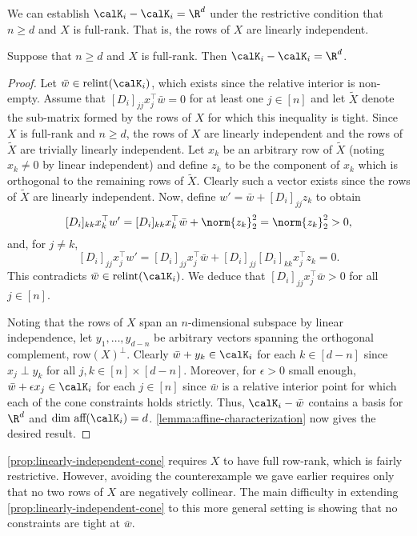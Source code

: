 \documentclass{article}
\begin{document}
We can establish \( \calK_i - \calK_i = \R^d \) under the restrictive condition that \( n \geq d \) and \( X \) is full-rank.
That is, the rows of \( X \) are linearly independent.
\begin{proposition}\label{prop:linearly-independent-cone}
	Suppose that \( n \geq d \) and \( X \) is full-rank.
	Then \( \calK_i - \calK_i = \R^d \).
\end{proposition}
\begin{proof}
	Let \( \bar w \in \text{relint} (\calK_i) \), which exists since the relative interior is non-empty.
	Assume that \( [D_i]_{jj} x_j^\top \bar w = 0 \) for at least one \( j \in [n] \) and let \( \tilde X \) denote the sub-matrix formed by the rows of \( X \) for which this inequality is tight.
	Since \( X \) is full-rank and \( n \geq d \), the rows of \( X \) are linearly independent and the rows of \( \tilde X \) are trivially linearly independent.
	Let \( x_k \) be an arbitrary row of \( \tilde X \) (noting \( x_k \neq 0 \) by linear independent) and define \( z_k \) to be the component of \( x_k \) which is orthogonal to the remaining rows of \( \tilde X \).
	Clearly such a vector exists since the rows of \( \tilde X \) are linearly independent.
	Now, define \( w' = \bar w + [D_i]_{jj} z_k \) to obtain
	\[
		[D_i]_{kk} x_k^\top w' = [D_i]_{kk} x_k^\top \bar w + \norm{z_k}_2^2 = \norm{z_k}_2^2 > 0,
	\]
	and, for \( j \neq k \),
	\[
		[D_i]_{jj} x_j^\top w' = [D_i]_{jj} x_{j}^\top \bar w +  [D_i]_{jj} [D_i]_{kk} x_{j}^\top z_k = 0.
	\]
	This contradicts \( \bar w \in \text{relint} (\calK_i) \).
	We deduce that \( [D_i]_{jj} x_j^\top \bar w > 0 \) for all \( j \in [n] \).

	Noting that the rows of \( X \) span an \( n \)-dimensional subspace by linear independence,
	let \( y_{1}, \ldots, y_{d-n} \) be arbitrary vectors spanning the orthogonal complement, \( \text{row}(X)^\perp \).
	Clearly \( \bar w + y_{k} \in \calK_i \) for each \( k \in [d-n] \) since \( x_j \perp y_k \) for all \( j, k \in [n] \times [d-n] \).
	Moreover, for \( \epsilon > 0 \) small enough, \( \bar w + \epsilon x_{j} \in \calK_i \) for each \( j \in [n] \) since \( \bar w \) is a relative interior point for which each of the cone constraints holds strictly.
	Thus, \( \calK_i - \bar w\) contains a basis for \( \R^d \) and \( \text{dim aff} (\calK_i) = d \).
	\autoref{lemma:affine-characterization} now gives the desired result.

\end{proof}

\autoref{prop:linearly-independent-cone} requires \( X \) to have full row-rank, which is fairly restrictive. 
However, avoiding the counterexample we gave earlier requires only that no two rows of \( X \) are negatively collinear.
The main difficulty in extending \autoref{prop:linearly-independent-cone} to this more general setting is showing that no constraints are tight at \( \bar w \).

\printbibliography[]
\end{document}
